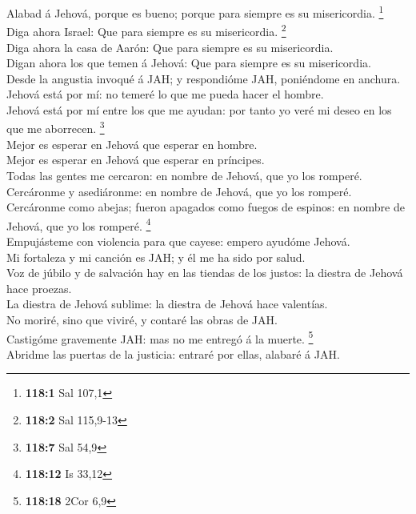  Alabad á Jehová, porque es bueno; porque para siempre es
su misericordia. \footnote{\textbf{118:1} Sal 107,1}\\
 Diga ahora Israel: Que para siempre es su misericordia.
\footnote{\textbf{118:2} Sal 115,9-13}\\
 Diga ahora la casa de Aarón: Que para siempre es su
misericordia.\\
 Digan ahora los que temen á Jehová: Que para siempre es
su misericordia.\\
 Desde la angustia invoqué á JAH; y respondióme JAH,
poniéndome en anchura.\\
 Jehová está por mí: no temeré lo que me pueda hacer el
hombre.\\
 Jehová está por mí entre los que me ayudan: por tanto yo
veré mi deseo en los que me aborrecen. \footnote{\textbf{118:7} Sal 54,9}\\
 Mejor es esperar en Jehová que esperar en hombre.\\
 Mejor es esperar en Jehová que esperar en príncipes.\\
 Todas las gentes me cercaron: en nombre de Jehová, que
yo los romperé.\\
 Cercáronme y asediáronme: en nombre de Jehová, que yo
los romperé.\\
 Cercáronme como abejas; fueron apagados como fuegos de
espinos: en nombre de Jehová, que yo los romperé. \footnote{\textbf{118:12}
  Is 33,12}\\
 Empujásteme con violencia para que cayese: empero
ayudóme Jehová.\\
 Mi fortaleza y mi canción es JAH; y él me ha sido por
salud.\\
 Voz de júbilo y de salvación hay en las tiendas de los
justos: la diestra de Jehová hace proezas.\\
 La diestra de Jehová sublime: la diestra de Jehová hace
valentías.\\
 No moriré, sino que viviré, y contaré las obras de
JAH.\\
 Castigóme gravemente JAH: mas no me entregó á la muerte.
\footnote{\textbf{118:18} 2Cor 6,9}\\
 Abridme las puertas de la justicia: entraré por ellas,
alabaré á JAH.\\
